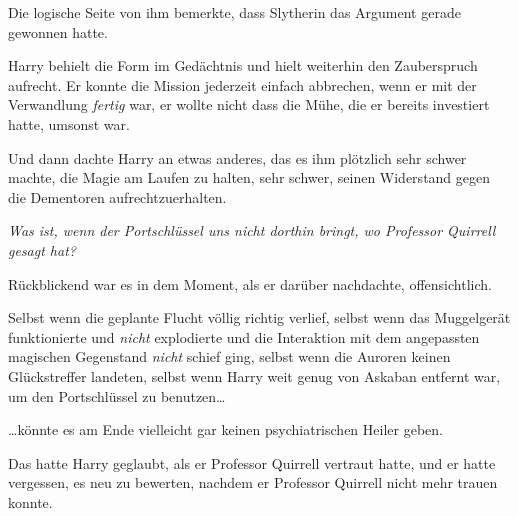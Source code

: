 Die logische Seite von ihm bemerkte, dass Slytherin das Argument gerade gewonnen hatte.

Harry behielt die Form im Gedächtnis und hielt weiterhin den Zauberspruch aufrecht. Er konnte die Mission jederzeit einfach abbrechen, wenn er mit der Verwandlung \emph{fertig} war, er wollte nicht dass die Mühe, die er bereits investiert hatte, umsonst war.

Und dann dachte Harry an etwas anderes, das es ihm plötzlich sehr schwer machte, die Magie am Laufen zu halten, sehr schwer, seinen Widerstand gegen die Dementoren aufrechtzuerhalten.

\emph{Was ist, wenn der Portschlüssel uns nicht dorthin bringt, wo Professor Quirrell gesagt hat?}

Rückblickend war es in dem Moment, als er darüber nachdachte, offensichtlich.

Selbst wenn die geplante Flucht völlig richtig verlief, selbst wenn das Muggelgerät funktionierte und \emph{nicht} explodierte und die Interaktion mit dem angepassten magischen Gegenstand \emph{nicht} schief ging, selbst wenn die Auroren keinen Glückstreffer landeten, selbst wenn Harry weit genug von Askaban entfernt war, um den Portschlüssel zu benutzen…

…könnte es am Ende vielleicht gar keinen psychiatrischen Heiler geben.

Das hatte Harry geglaubt, als er Professor Quirrell vertraut hatte, und er hatte vergessen, es neu zu bewerten, nachdem er Professor Quirrell nicht mehr trauen konnte.

